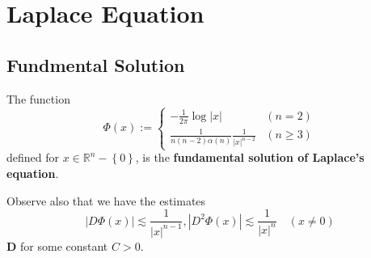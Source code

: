 \chapter{Laplace Equation}

\section{Fundmental Solution} %
\begin{definition}
    The function
    \begin{equation*}
        \Phi(x)
        :=
        \begin{cases}
            -\frac{1}{2 \pi} \log \left|x\right|           & (n=2)      \\
            \frac{1}{n(n-2) \alpha(n)} \frac{1}{|x|^{n-2}} & (n \geq 3)
        \end{cases}
    \end{equation*}
    defined for $x \in \mathbb{R}^n-\left\{0\right\}$, is the \textbf{fundamental solution of Laplace's equation}.
\end{definition}

\begin{proposition}
    Observe also that we have the estimates
    \begin{equation*}
        |D \Phi(x)|
        \lesssim
        \frac{1}{|x|^{n-1}},
        \left|D^2 \Phi(x)\right| \lesssim \frac{1}{|x|^n} \quad(x \neq 0)
    \end{equation*}
    $\mathbf{D}$
    for some constant $C>0$.
\end{proposition}
